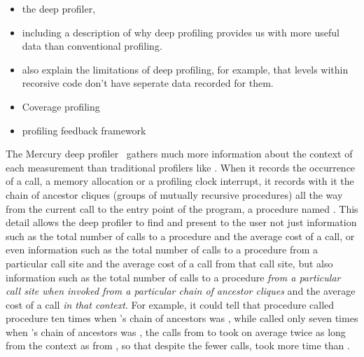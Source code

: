 

\begin{itemize}
\item the deep profiler,
\item including a description of why deep profiling provides us with
      more useful data than conventional profiling.
\item also explain the limitations of deep profiling,
      for example, that levels within recorsive code don't have seperate
      data recorded for them.
\item Coverage profiling 
\item profiling feedback framework
\end{itemize}


The Mercury deep profiler~\cite{conway:2001:mercury-deep}
gathers much more information about the context of each measurement
than traditional profilers like \cite{gprof}.
When it records the occurrence
of a call, a memory allocation or a profiling clock interrupt,
it records with it the chain of ancestor cliques
(groups of mutually recursive procedures)
all the way from the current call to the entry point of the program,
a procedure named .
This detail allows the deep profiler
to find and present to the user
not just information such as the total number of calls to a procedure
and the average cost of a call,
or even information such as the total number of calls to a procedure
from a particular call site and the average cost of a call from that call site,
but also information such as the total number of calls to a procedure
\emph{from a particular call site
when invoked from a particular chain of ancestor cliques}
and the average cost of a call \emph{in that context}.
For example, it could tell that
procedure  called procedure  ten times
when 's chain of ancestors was ,
while  called  only seven times
when 's chain of ancestors was ,
the calls from  to  took on average twice as long
from the  context as from ,
so that despite the fewer calls,
 took more time than .

